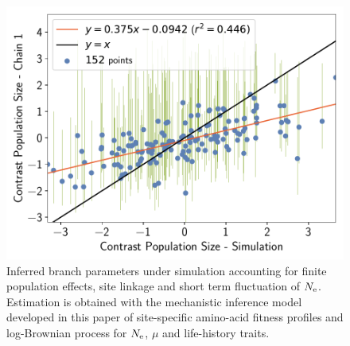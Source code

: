 \documentclass{article}
\begin{document}
\begin{figure}[H]
\begin{minipage}{0.32\linewidth}
			\includegraphics[width=\linewidth, page=1]{simulations/SimuPoly_SiteMutSelBranchNe_BranchCorrelation_ContrastPopulationSize}
		\end{minipage} \hfill
		\caption[Inferred branch parameters for \texttt{SimuPoly}]{
		Inferred branch parameters under simulation accounting for finite population effects, site linkage and short term fluctuation of $N_{\text{e}}$.
		Estimation is obtained with the mechanistic inference model developed in this paper of site-specific amino-acid fitness profiles and log-Brownian process for $N_{\text{e}}$, $\mu$ and life-history traits.
		}
	\end{figure}
\end{document}
